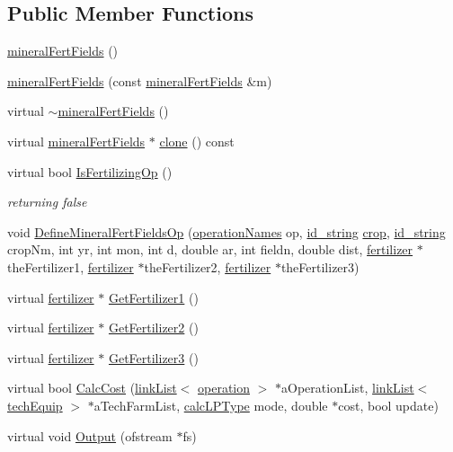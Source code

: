\subsection*{Public Member Functions}
\begin{DoxyCompactItemize}
\item 
\hyperlink{classmineral_fert_fields_ab9398eaffbf41879b66ec028d442e617}{mineralFertFields} ()
\item 
\hyperlink{classmineral_fert_fields_ae199e71e7532a348e6c251a94104e7ee}{mineralFertFields} (const \hyperlink{classmineral_fert_fields}{mineralFertFields} \&m)
\item 
virtual \hyperlink{classmineral_fert_fields_ab9828f2f16f5a2bd870beeaa2a0a57a0}{$\sim$mineralFertFields} ()
\item 
virtual \hyperlink{classmineral_fert_fields}{mineralFertFields} $\ast$ \hyperlink{classmineral_fert_fields_a29eb4d8ad0e09942f75f531c8b7c44b6}{clone} () const 
\item 
virtual bool \hyperlink{classmineral_fert_fields_a73b4d9ac6b06da725809f785a88edff1}{IsFertilizingOp} ()
\begin{DoxyCompactList}\small\item\em returning false \item\end{DoxyCompactList}\item 
void \hyperlink{classmineral_fert_fields_a0fcabc516dd032435d3758a059a1c0f9}{DefineMineralFertFieldsOp} (\hyperlink{operation_names_8h_a77d40de6faa131199a5de6df3d9c7e3d}{operationNames} op, \hyperlink{classfield_operation_fields_a65517d20c09329343461131d07d48ecb}{id\_\-string} \hyperlink{classcrop}{crop}, \hyperlink{classfield_operation_fields_a65517d20c09329343461131d07d48ecb}{id\_\-string} cropNm, int yr, int mon, int d, double ar, int fieldn, double dist, \hyperlink{classfertilizer}{fertilizer} $\ast$theFertilizer1, \hyperlink{classfertilizer}{fertilizer} $\ast$theFertilizer2, \hyperlink{classfertilizer}{fertilizer} $\ast$theFertilizer3)
\item 
virtual \hyperlink{classfertilizer}{fertilizer} $\ast$ \hyperlink{classmineral_fert_fields_a3a79f76ebce8738baa828a0b11db1f54}{GetFertilizer1} ()
\item 
virtual \hyperlink{classfertilizer}{fertilizer} $\ast$ \hyperlink{classmineral_fert_fields_a5c793240c6b803ab87c19d0be3513ea5}{GetFertilizer2} ()
\item 
virtual \hyperlink{classfertilizer}{fertilizer} $\ast$ \hyperlink{classmineral_fert_fields_a312491a593ff9258446d24704d833f5b}{GetFertilizer3} ()
\item 
virtual bool \hyperlink{classmineral_fert_fields_a9d71379448708130be77ca7166bb99dc}{CalcCost} (\hyperlink{classlink_list}{linkList}$<$ \hyperlink{classoperation}{operation} $>$ $\ast$aOperationList, \hyperlink{classlink_list}{linkList}$<$ \hyperlink{classtech_equip}{techEquip} $>$ $\ast$aTechFarmList, \hyperlink{typer_8h_af05cf854fc14086a0d6404be5ae9813f}{calcLPType} mode, double $\ast$cost, bool update)
\item 
virtual void \hyperlink{classmineral_fert_fields_abbb016beaa3ec35d35a9ea0001c7b96c}{Output} (ofstream $\ast$fs)
\end{DoxyCompactItemize}


